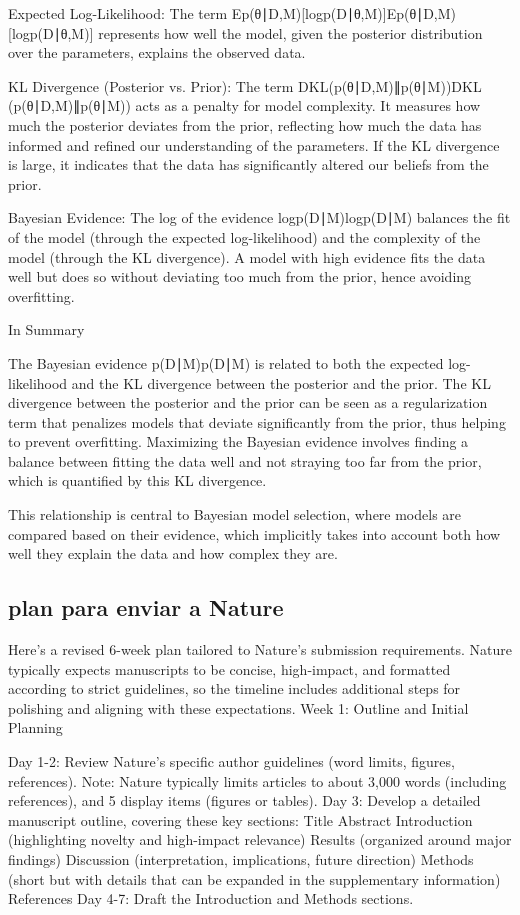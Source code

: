 \documentclass[pdflatex,sn-mathphys-num]{sn-jnl}%
\theoremstyle{thmstyleone}%
\theoremstyle{thmstyletwo}%
\theoremstyle{thmstylethree}%
\begin{document}
	Expected Log-Likelihood: The term Ep(θ∣D,M)[log⁡p(D∣θ,M)]Ep(θ∣D,M)​[logp(D∣θ,M)] represents how well the model, given the posterior distribution over the parameters, explains the observed data.
	
	KL Divergence (Posterior vs. Prior): The term DKL(p(θ∣D,M)∥p(θ∣M))DKL​(p(θ∣D,M)∥p(θ∣M)) acts as a penalty for model complexity. It measures how much the posterior deviates from the prior, reflecting how much the data has informed and refined our understanding of the parameters. If the KL divergence is large, it indicates that the data has significantly altered our beliefs from the prior.
	
	Bayesian Evidence: The log of the evidence log⁡p(D∣M)logp(D∣M) balances the fit of the model (through the expected log-likelihood) and the complexity of the model (through the KL divergence). A model with high evidence fits the data well but does so without deviating too much from the prior, hence avoiding overfitting.
	
	In Summary
	
	The Bayesian evidence p(D∣M)p(D∣M) is related to both the expected log-likelihood and the KL divergence between the posterior and the prior.
	The KL divergence between the posterior and the prior can be seen as a regularization term that penalizes models that deviate significantly from the prior, thus helping to prevent overfitting.
	Maximizing the Bayesian evidence involves finding a balance between fitting the data well and not straying too far from the prior, which is quantified by this KL divergence.
	
	This relationship is central to Bayesian model selection, where models are compared based on their evidence, which implicitly takes into account both how well they explain the data and how complex they are.

\subsection{plan para enviar a Nature}
Here’s a revised 6-week plan tailored to Nature's submission requirements. Nature typically expects manuscripts to be concise, high-impact, and formatted according to strict guidelines, so the timeline includes additional steps for polishing and aligning with these expectations.
Week 1: Outline and Initial Planning

Day 1-2: Review Nature's specific author guidelines (word limits, figures, references).
Note: Nature typically limits articles to about 3,000 words (including references), and 5 display items (figures or tables).
Day 3: Develop a detailed manuscript outline, covering these key sections:
Title
Abstract
Introduction (highlighting novelty and high-impact relevance)
Results (organized around major findings)
Discussion (interpretation, implications, future direction)
Methods (short but with details that can be expanded in the supplementary information)
References
Day 4-7: Draft the Introduction and Methods sections.
\end{document}
